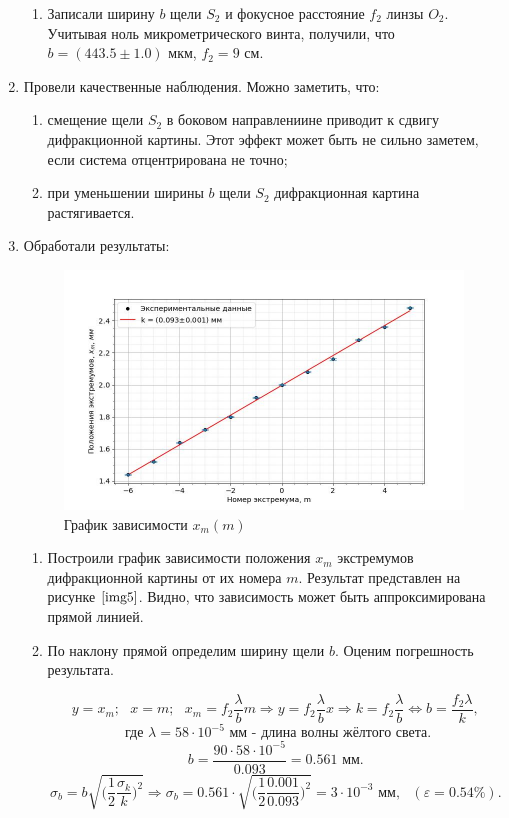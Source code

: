 \documentclass[a4paper,12pt]{article} %
\begin{document}
\begin{enumerate}
\begin{enumerate}
    \item Записали ширину $b$ щели $S_2$ и фокусное расстояние $f_2$ линзы $O_2$. Учитывая ноль микрометрического винта, получили, что $b=(443.5\pm1.0) \text{ мкм}$, $f_2=9\text{ см}$.
    \end{enumerate}
    \item Провели качественные наблюдения. Можно заметить, что:
    \begin{enumerate}
        \item смещение щели $S_2$ в боковом направлениине приводит к сдвигу дифракционной картины. Этот эффект может быть не сильно заметем, если система отцентрирована не точно;
        \item при уменьшении ширины $b$ щели $S_2$ дифракционная картина растягивается.
    \end{enumerate}
    \item Обработали результаты:
    \begin{figure}[h]
        \begin{center}
            \includegraphics[width=16cm]{image5.jpg}
        \end{center}
            \caption{График зависимости $x_{m}(m)$}
            \label{img5}
        \end{figure}
    \begin{enumerate}
        \item Построили график зависимости положения $x_{m}$ экстремумов дифракционной картины от их номера $m$. Результат представлен на рисунке $\ref{img5}$. Видно, что зависимость может быть аппроксимирована прямой линией.
        \item По наклону прямой определим ширину щели $b$. Оценим погрешность результата.

        \[ y=x_{m{}};\text{ }x=m;\text{ }x_{m}=f_2\frac{\lambda}{b}m \Longrightarrow y=f_2\frac{\lambda}{b}x\Longrightarrow k = f_2\frac{\lambda}{b} \Leftrightarrow b = \frac{f_2\lambda}{k},\]
        \[\text{ где }\lambda=58\cdot10^{-5}\text{ мм}\text{ - длина волны жёлтого света.} \]
    \[ b=\frac{90\cdot58\cdot10^{-5}}{0.093}=0.561\text{ мм}. \]
    \[ \sigma_{b} = b\sqrt{\Big(\frac{1}{2}\frac{\sigma_{k}}{k}\Big)^2} \Longrightarrow \sigma_{b} = 0.561\cdot\sqrt{\Big(\frac{1}{2}\frac{0.001}{0.093}\Big)^2}=3\cdot10^{-3}\text{ мм}, \text{ }(\varepsilon=0.54\%). \]


\end{enumerate}
\end{enumerate}
\end{document}
